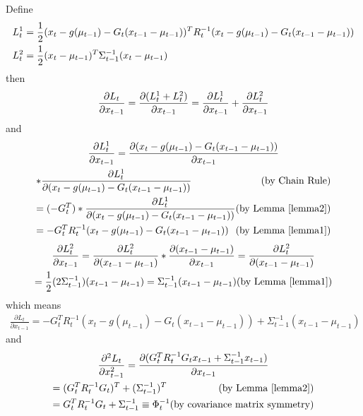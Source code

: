 Define 
\begin{multline*}
L^1_t = \frac{1}{2} (x_t - g(\mu_{t-1}) - G_t (x_{t-1} - \mu_{t-1}))^T R_t^{-1} (x_t - g(\mu_{t-1}) - G_t (x_{t-1} - \mu_{t-1})) \\
L^2_t = \frac{1}{2} (x_t - \mu_{t-1})^T \Sigma_{t-1}^{-1} (x_t - \mu_{t-1}) \hfill
\end{multline*}
then
\begin{multline*}
\frac{\partial L_t}{\partial x_{t-1}} = \frac{\partial (L^1_t + L^2_t)}{\partial x_{t-1}} = \frac{\partial L^1_t}{\partial x_{t-1}} + \frac{\partial L^2_t}{\partial x_{t-1}} \hfill
\end{multline*}
and
\begin{multline*}
\frac{\partial L^1_t}{\partial x_{t-1}} = \frac{\partial (x_t - g(\mu_{t-1}) - G_t (x_{t-1} - \mu_{t-1}))}{\partial x_{t-1}} \\ 
* \frac{\partial L^1_t}{\partial (x_t - g(\mu_{t-1}) - G_t (x_{t-1} - \mu_{t-1}))} \hfill \text{(by Chain Rule)} \\
= (-G_t^T) * \frac{\partial L^1_t}{\partial (x_t - g(\mu_{t-1}) - G_t (x_{t-1} - \mu_{t-1}))} \hfill \text{(by Lemma \ref{lemma2})} \\
= -G_t^TR_t^{-1}(x_t - g(\mu_{t-1}) - G_t (x_{t-1} - \mu_{t-1})) \hfill \text{(by Lemma \ref{lemma1})}
\end{multline*}
\begin{multline*}
\frac{\partial L^2_t}{\partial x_{t-1}} = \frac{\partial L^2_t}{\partial (x_{t-1} - \mu_{t-1})} * \frac{\partial (x_{t-1} - \mu_{t-1})}{\partial x_{t-1}} = \frac{\partial L^2_t}{\partial (x_{t-1} - \mu_{t-1})} \\
= \frac{1}{2} (2\Sigma_{t-1}^{-1}) (x_{t-1} - \mu_{t-1}) =  \Sigma_{t-1}^{-1}(x_{t-1} - \mu_{t-1}) \hfill \text{(by Lemma \ref{lemma1})}
\end{multline*}
which means
\begin{multline*}
\frac{\partial L_t}{\partial x_{t-1}} = -G_t^TR_t^{-1}(x_t - g(\mu_{t-1}) - G_t (x_{t-1} - \mu_{t-1})) + \Sigma_{t-1}^{-1}(x_{t-1} - \mu_{t-1})
\end{multline*}
and
\begin{multline*}
\frac{\partial^2 L_t}{\partial x_{t-1}^2} = \frac{\partial (G_t^TR_t^{-1}G_tx_{t-1} + \Sigma_{t-1}^{-1}x_{t-1})}{\partial x_{t-1}} \\
= (G_t^TR_t^{-1}G_t)^T + (\Sigma_{t-1}^{-1})^T \hfill \text{(by Lemma \ref{lemma2})} \\
= G_t^TR_t^{-1}G_t + \Sigma_{t-1}^{-1} \equiv \Phi_t^{-1} \hfill \text{(by covariance matrix symmetry)}
\end{multline*}
